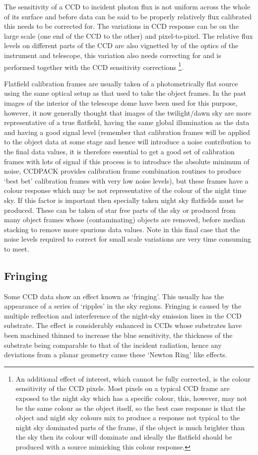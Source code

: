 The sensitivity of a CCD to incident photon flux is not uniform across
the whole of its surface and before data can be said to be properly
relatively flux calibrated this needs to be corrected for. The
variations in CCD response can be on the large scale (one end of the CCD
to the other) and pixel-to-pixel. The relative flux levels on different
parts of the CCD are also vignetted by of the optics of the instrument
and telescope, this variation also needs correcting for and is performed
together with the CCD sensitivity corrections \footnote {An additional
effect of interest, which cannot be fully corrected, is the colour
sensitivity of the CCD pixels. Most pixels on a typical CCD frame are
exposed to the night sky which has a specific colour, this, however, may
not be the same colour as the object itself, so the best case response
is that the object and night sky colours mix to produce a response not
typical to the night sky dominated parts of the frame, if the object is
much brighter than the sky then its colour will dominate and ideally the
flatfield should be produced with a source mimicking this colour
response.}.

Flatfield calibration frames are usually taken of a photometrically flat
source using the same optical setup as that used to take the object
frames. In the past images of the interior of the telescope dome have
been used for this purpose, however, it now generally thought that
images of the twilight/dawn sky are more representative of a true
flatfield, having the same global illumination as the data and having a
good signal level (remember that calibration frames will be applied to
the object data at some stage and hence will introduce a noise
contribution to the final data values, it is therefore essential to get
a good set of calibration frames with lots of signal if this process is
to introduce the absolute minimum of noise, CCDPACK provides calibration
frame combination routines to produce `best bet' calibration frames with
very low noise levels), but these frames have a colour response which
may be not representative of the colour of the night time sky. If this
factor is important then specially taken night sky flatfields must be
produced. These can be taken of star free parts of the sky or produced
from many object frames whose (contaminating) objects are removed,
before median stacking to remove more spurious data values. Note in this
final case that the noise levels required to correct for small scale
variations are very time consuming to meet.

\subsection{Fringing}
Some CCD data show an effect known as `fringing'. This usually has the
appearance of a series of `ripples' in the sky regions. Fringing is
caused by the multiple reflection and interference of the night-sky
emission lines in the CCD substrate. The effect is considerably enhanced
in CCDs whose substrates have been machined thinned to increase the blue
sensitivity, the thickness of the substrate being comparable to that of
the incident radiation, hence any deviations from a planar geometry
cause these `Newton Ring' like effects.

